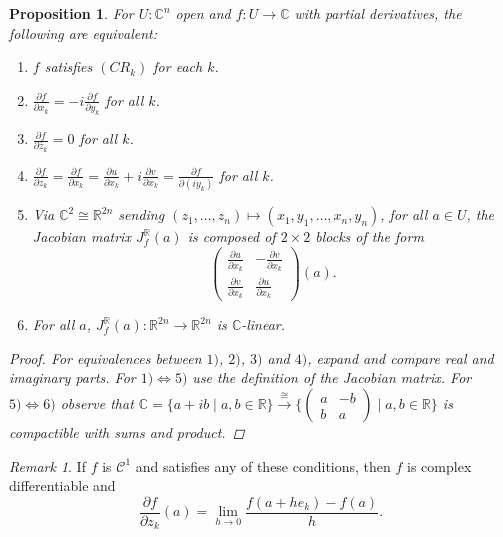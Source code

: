 \documentclass[11pt,A4]{article}
\theoremstyle{plain}
\newtheorem{prop}[thm]{Proposition}
\theoremstyle{definition}
\theoremstyle{remark}
\newtheorem{rem}[thm]{Remark}
\newcommand{\R}{\mathbb{R}}
\newcommand{\1}{\mathbbm{1}}
\newcommand{\C}{\mathbb{C}}
\newcommand{\calC}{\mathcal{C}}
\begin{document}
\begin{prop}
    For $U\colon \C^{n}$ open and $f\colon U\to \C$ with partial derivatives, the following are equivalent:
    \begin{enumerate}[label=\arabic*)]
	\item $f$ satisfies $(CR_{k})$ for each $k$.
	\item $\frac{\partial f}{\partial x_{k}}=-i\frac{\partial f}{\partial y_{k}}$ for all $k$.
	\item $\frac{\partial f}{\partial \bar{z}_{k}}=0$ for all $k$.
	\item $\frac{\partial f}{\partial z_{k}}=\frac{\partial f}{\partial x_{k}}=\frac{\partial u}{\partial x_{k}}+i\frac{\partial v}{\partial x_{k}}=\frac{\partial f}{\partial (iy_{k})}$ for all $k$.
	\item Via $\C^{2}\cong \R^{2n}$ sending $(z_{1},\ldots,z_{n})\mapsto (x_{1},y_{1},\ldots, x_{n},y_{n})$, for all $a\in U$, the Jacobian matrix  $J_{f}^{\R}(a)$ is composed of $2\times 2$ blocks of the form
	    \[ \begin{pmatrix} \frac{\partial u}{\partial x_{k}} & -\frac{\partial v}{\partial x_{k}} \\ \frac{\partial v}{\partial x_{k}} & \frac{\partial u}{\partial x_{k}}
	    \end{pmatrix}(a).\]
	\item For all $a$, $J_{f}^{\R}(a)\colon \R^{2n}\to \R^{2n}$ is $\C$-linear.
    \end{enumerate}
    \begin{proof}
	For equivalences between $1)$, $2)$, $3)$ and $4)$, expand and compare real and imaginary parts.
	For $1)\Leftrightarrow 5)$ use the definition of the Jacobian matrix.
	For $5)\Leftrightarrow 6)$ observe that $\C=\{a+ib\mid a,b\in \R\} \xrightarrow{\cong} \{ \begin{pmatrix} a & -b \\ b & a \end{pmatrix} \mid a,b\in \R\}$ is compactible with sums and product.
    \end{proof}
\end{prop}

\begin{rem}
    If $f$ is $\calC^{1}$ and satisfies any of these conditions, then $f$ is complex differentiable and
    \[ \frac{\partial f}{\partial z_{k}}(a)=\lim_{h\to 0}\frac{f(a+he_{k})-f(a)}{h}.\]
\end{rem}
\end{document}
